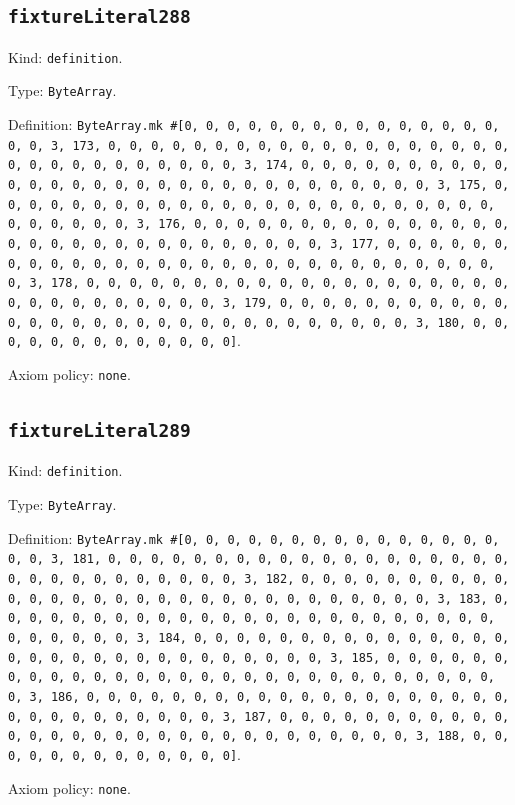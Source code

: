 \documentclass[11pt]{article}
\begin{document}
\subsection*{\texttt{fixtureLiteral288}}
\noindent Kind: \texttt{definition}.\par
\noindent Type: \texttt{ByteArray}.\par
\noindent Definition: \texttt{ByteArray.mk \#[0, 0, 0, 0, 0, 0, 0, 0, 0, 0, 0, 0, 0, 0, 0, 0, 0, 3, 173, 0, 0, 0, 0, 0, 0, 0, 0, 0, 0, 0, 0, 0, 0, 0, 0, 0, 0, 0, 0, 0, 0, 0, 0, 0, 0, 0, 0, 0, 0, 3, 174, 0, 0, 0, 0, 0, 0, 0, 0, 0, 0, 0, 0, 0, 0, 0, 0, 0, 0, 0, 0, 0, 0, 0, 0, 0, 0, 0, 0, 0, 0, 3, 175, 0, 0, 0, 0, 0, 0, 0, 0, 0, 0, 0, 0, 0, 0, 0, 0, 0, 0, 0, 0, 0, 0, 0, 0, 0, 0, 0, 0, 0, 0, 3, 176, 0, 0, 0, 0, 0, 0, 0, 0, 0, 0, 0, 0, 0, 0, 0, 0, 0, 0, 0, 0, 0, 0, 0, 0, 0, 0, 0, 0, 0, 0, 3, 177, 0, 0, 0, 0, 0, 0, 0, 0, 0, 0, 0, 0, 0, 0, 0, 0, 0, 0, 0, 0, 0, 0, 0, 0, 0, 0, 0, 0, 0, 0, 3, 178, 0, 0, 0, 0, 0, 0, 0, 0, 0, 0, 0, 0, 0, 0, 0, 0, 0, 0, 0, 0, 0, 0, 0, 0, 0, 0, 0, 0, 0, 0, 3, 179, 0, 0, 0, 0, 0, 0, 0, 0, 0, 0, 0, 0, 0, 0, 0, 0, 0, 0, 0, 0, 0, 0, 0, 0, 0, 0, 0, 0, 0, 0, 3, 180, 0, 0, 0, 0, 0, 0, 0, 0, 0, 0, 0, 0, 0]}.\par
\noindent Axiom policy: \texttt{none}.\par
\subsection*{\texttt{fixtureLiteral289}}
\noindent Kind: \texttt{definition}.\par
\noindent Type: \texttt{ByteArray}.\par
\noindent Definition: \texttt{ByteArray.mk \#[0, 0, 0, 0, 0, 0, 0, 0, 0, 0, 0, 0, 0, 0, 0, 0, 0, 3, 181, 0, 0, 0, 0, 0, 0, 0, 0, 0, 0, 0, 0, 0, 0, 0, 0, 0, 0, 0, 0, 0, 0, 0, 0, 0, 0, 0, 0, 0, 0, 3, 182, 0, 0, 0, 0, 0, 0, 0, 0, 0, 0, 0, 0, 0, 0, 0, 0, 0, 0, 0, 0, 0, 0, 0, 0, 0, 0, 0, 0, 0, 0, 3, 183, 0, 0, 0, 0, 0, 0, 0, 0, 0, 0, 0, 0, 0, 0, 0, 0, 0, 0, 0, 0, 0, 0, 0, 0, 0, 0, 0, 0, 0, 0, 3, 184, 0, 0, 0, 0, 0, 0, 0, 0, 0, 0, 0, 0, 0, 0, 0, 0, 0, 0, 0, 0, 0, 0, 0, 0, 0, 0, 0, 0, 0, 0, 3, 185, 0, 0, 0, 0, 0, 0, 0, 0, 0, 0, 0, 0, 0, 0, 0, 0, 0, 0, 0, 0, 0, 0, 0, 0, 0, 0, 0, 0, 0, 0, 3, 186, 0, 0, 0, 0, 0, 0, 0, 0, 0, 0, 0, 0, 0, 0, 0, 0, 0, 0, 0, 0, 0, 0, 0, 0, 0, 0, 0, 0, 0, 0, 3, 187, 0, 0, 0, 0, 0, 0, 0, 0, 0, 0, 0, 0, 0, 0, 0, 0, 0, 0, 0, 0, 0, 0, 0, 0, 0, 0, 0, 0, 0, 0, 3, 188, 0, 0, 0, 0, 0, 0, 0, 0, 0, 0, 0, 0, 0]}.\par
\noindent Axiom policy: \texttt{none}.\par
\end{document}
